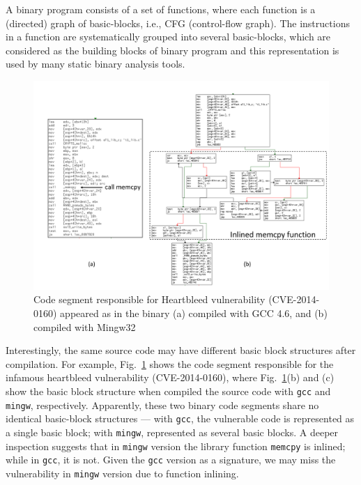 A binary program consists of a set of functions, where each function is a (directed) graph of basic-blocks, i.e., CFG (control-flow graph). The instructions in a function are systematically  grouped into several basic-blocks, which are considered as the building blocks of binary program and this representation is used by many static binary analysis tools.
\begin{figure}[ht]
  \includegraphics[width=\linewidth]{srj-figures/srj-moti_ex2.pdf}
  \caption{Code segment responsible for Heartbleed vulnerability (CVE-2014-0160) appeared as in the binary (a) compiled with GCC 4.6, and (b) compiled with Mingw32} \label{fig:prob_stat}
\end{figure}

Interestingly, the same source code may have different basic block structures after compilation. For example, Fig.~\ref{fig:prob_stat} shows the code segment responsible for the infamous heartbleed vulnerability (CVE-2014-0160), where Fig.~\ref{fig:prob_stat}(b) and (c) show the basic block structure when compiled the source code with \texttt{gcc} and \texttt{mingw}, respectively. Apparently, these two binary code segments share no identical basic-block structures --- with \texttt{gcc}, the vulnerable code is represented as a single basic block;  with \texttt{mingw}, represented as several basic blocks. A deeper inspection suggests that in \texttt{mingw} version the library function \texttt{memcpy} is inlined; while in \texttt{gcc}, it is not. %
Given the \texttt{gcc} version as a signature, we may miss the vulnerability in \texttt{mingw} version due to function inlining. 

